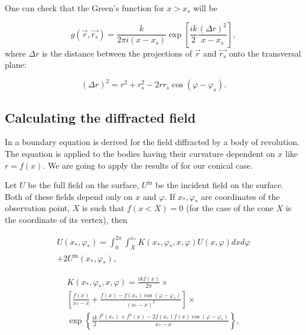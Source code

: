 \documentclass{procDDs}
\begin{document}
One can check that the Green's function for $x > x_s$ will be

\begin{equation}\label{greens_sol}                     
g(\vec{r}, \vec{r_s}) = \frac{k}{2\pi i (x-x_s)} \exp \left[   \frac{ik}{2} \frac{(\Delta r)^2}{x-x_s}\right],
\end{equation}
where $\Delta r$ is the distance between the projections of $\vec{r}$ and $\vec{r_s}$ onto the transversal plane:

\begin{equation}\label{delta_r}                     
(\Delta r)^2 = r^2 + r_s^2 - 2r r_s \cos(\varphi - \varphi_s).
\end{equation}


\subsection{Calculating the diffracted field}

In \cite{Shanin_parabolic} a boundary equation is derived for the field diffracted by a body of revolution. The equation is applied to the bodies having their curvature dependent on $x$ like $r = f(x)$. We are going to apply the results of \cite{Shanin_parabolic} for our conical case.

Let $U$ be the full field on the surface, $U^{\text{in}}$ be the incident field on the surface. Both of these fields depend only on $x$ and $\varphi$. If $x_*, \varphi_*$ are coordinates of the observation point, $X$ is such that $f(x<X) = 0$ (for the case of the cone $X$ is the coordinate of its vertex), then

\begin{multline}\label{int_eq} 
U(x_*, \varphi_*) = \int_{0}^{2\pi}\int_{X}^{x_*} K(x_*, \varphi_*, x, \varphi) U(x, \varphi) dx d\varphi \\
+ 2U^{\text{in}}(x_*, \varphi_*),
\end{multline}

\begin{multline} \label{int_ker}                   
K(x_*, \varphi_*, x, \varphi) = \frac{ikf(x)}{2\pi} \times \\
\left[ \frac{\dot{f}(x)}{x_* - x} +\frac{f(x) - f(x_*) \cos(\varphi - \varphi_*)}{(x_* - x)^2}\right] \times \\
\exp \left\lbrace  \frac{ik}{2}  \frac{f^2(x_*) + f^2(x) - 2f(x_*) f(x) \cos(\varphi - \varphi_*)}{x_* - x} \right\rbrace,
\end{multline}
\end{document}
